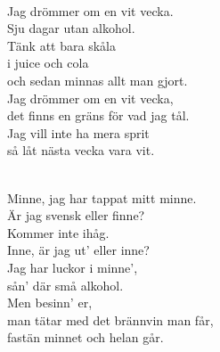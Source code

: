 
 \\       

\songtext{}Jag drömmer om en vit vecka.\\ 
Sju dagar utan alkohol.\\ 
Tänk att bara skåla\\ 
i juice och cola\\ 
och sedan minnas allt man gjort.\\ 
Jag drömmer om en vit vecka,\\ 
det finns en gräns för vad jag tål.\\ 
Jag vill inte ha mera sprit\\ 
så låt nästa vecka vara vit. \\


 \\       
\author{Text: Bosse Österberg}

\songtext{}Minne, jag har tappat mitt minne.\\
Är jag svensk eller finne?\\
Kommer inte ihåg.\\
Inne, är jag ut' eller inne?\\
Jag har luckor i minne',\\
sån' där små alkohol.\\
Men besinn' er,\\
man tätar med det brännvin man får,\\
fastän minnet och helan går.


\newpage


 \\       

